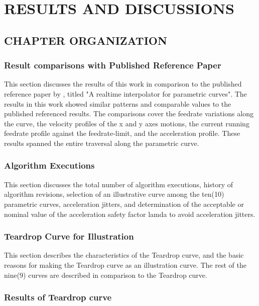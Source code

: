\chapter{RESULTS AND DISCUSSIONS}


\section{CHAPTER ORGANIZATION}


\subsection{Result comparisons with Published Reference Paper}

This section discusses the results of this work in comparison to the published reference paper by \cite{Zhong-etal:2018}, titled "A realtime interpolator for parametric curves". The results in this work showed similar patterns and comparable values to the published referenced results. The comparisons cover the feedrate variations along the curve, the velocity profiles of the x and y axes motions, the current running feedrate profile against the feedrate-limit,  and the acceleration profile.  These results spanned the entire traversal along the parametric curve. 
  

\subsection{Algorithm Executions}

This section discusses the total number of algorithm executions, history of algorithm revisions, selection of an illustrative curve among the ten(10) parametric curves, acceleration jitters, and determination of the acceptable or nominal value of the acceleration safety factor lamda to avoid acceleration jitters.  

\subsection{Teardrop Curve for Illustration}

This section describes the characteristics of the Teardrop curve, and the basic reasons for making the Teardrop curve as an illustration curve. The rest of the nine(9) curves are described in comparison to the Teardrop curve.

\subsection{Results of Teardrop curve}

